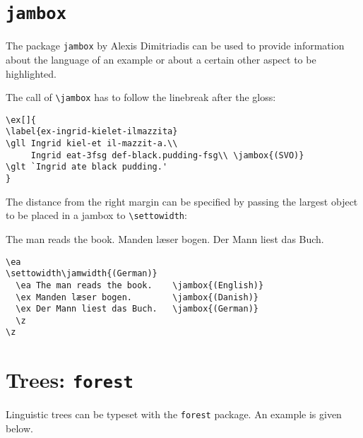 \def\exfont{\normalsize\upshape}

\section{\texttt{jambox}}
\label{sec-jambox}


The package \texttt{jambox} by Alexis Dimitriadis can be used to provide information about the language of an example or
about a certain other aspect to be highlighted.

\settowidth{}
\eal
{}
\zl

The call of \verb+\jambox+ has to follow the linebreak after the gloss:
\begin{verbatim}
\ex[]{
\label{ex-ingrid-kielet-ilmazzita}
\gll Ingrid kiel-et il-mazzit-a.\\
     Ingrid eat-3fsg def-black.pudding-fsg\\ \jambox{(SVO)}
\glt `Ingrid ate black pudding.'
}
\end{verbatim}
The distance from the right margin can be specified by passing the largest object to be placed in a
jambox to \verb+\settowidth+:

\ea 
\settowidth{}
  \ea The man reads the book.    
  \ex Manden læser bogen.        
  \ex Der Mann liest das Buch.   
  \z 
\z

\begin{verbatim}
\ea 
\settowidth\jamwidth{(German)}
  \ea The man reads the book.    \jambox{(English)}
  \ex Manden læser bogen.        \jambox{(Danish)}
  \ex Der Mann liest das Buch.   \jambox{(German)}
  \z
\z
\end{verbatim}



\section{Trees: \texttt{forest}}
Linguistic trees can be typeset with the \verb+forest+ package. An example is given below.

